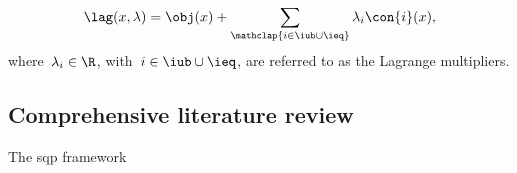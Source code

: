 \begin{equation}
    \label{eq:lag}
    \lag(x, \lambda) = \obj(x) + \sum_{\mathclap{i \in \iub \cup \ieq}} \lambda_i \con{i}(x),
\end{equation}
%
where~$\lambda_i \in \R$, with~$i \in \iub \cup \ieq$, are referred to as the Lagrange multipliers.

\subsection{Comprehensive literature review}

The \gls{sqp} framework~\cite{Han_1976,Han_1977,Powell_1978a,Powell_1978b,Wilson_1963}
